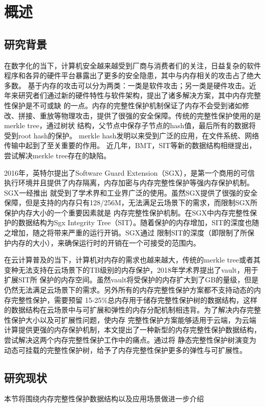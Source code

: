 
\chapter{概述}

\section{研究背景}
在数字化的当下，计算机安全越来越受到厂商与消费者们的关注，日益复杂的软件程序和各异的硬件平台暴露出了更多的安全隐患，其中与内存相关的攻击占了绝大多数。
基于内存的攻击可以分为两类：一类是软件攻击；另一类是硬件攻击。近年来研究者们通过新的硬件特性与软件架构，提出了诸多解决方案，其中内存完整性保护是不可或缺
的一点。内存的完整性保护机制保证了内存不会受到诸如修改、拼接、重放等物理攻击，提供了很强的安全保障。传统的完整性保护使用的是merkle tree，通过树状
结构，父节点中保存子节点的hash值，最后所有的数据将受到root hash的保护。 merkle hash发明以来受到广泛的应用，在文件系统、网络传输中起到了至关重要的作用。
近几年，BMT，SIT等新的数据结构相继提出，尝试解决merkle tree存在的缺陷。

2016年，英特尔提出了Software Guard Extension（SGX），是第一个商用的可信执行环境并且提供了内存隔离，内存加密与内存完整性保护等强内存保护机制。SGX一经推出
就受到了学术界和工业界广泛的使用。虽然SGX提供了很强的安全保障，但是支持的内存只有128/256M，无法满足云场景下的需求，而限制SGX所保护内存大小的一个重要因素就是
内存完整性保护机制。在SGX中内存完整性保护的数据结构为Sgx Integrity Tree（SIT）。随着保护的内存增加，SIT的深度也随之增加，随之将带来严重的运行开销。SGX通过
限制SIT的深度（即限制了所保护内存的大小），来确保运行时的开销在一个可接受的范围内。 

在云计算普及的当下，计算机对内存的需求也越来越大，传统的merkle tree或者其变种无法支持在云场景下的TB级别的内存保护，2018年学术界提出了vault，用于扩展SIT所
保护的内存空间。虽然vault将受保护的内存扩大到了GB的量级，但是仍然无法满足云场景下的需求。另外所有的内存完整性保护方案都不支持动态的内存完整性保护，需要预留
15-25\%总内存用于储存完整性保护树的数据结构，这样的数据结构在云场景中与可扩展和弹性的内存分配机制相违背。为了解决内存完整性保护大小以及可扩展性问题，使内存
完整性保护方案能够适用于云端，为云端计算提供更强的内存保护机制，本文提出了一种新型的内存完整性保护数据结构，尝试解决这两个内存完整性保护工作中的痛点。通过将
静态完整性保护树演变为动态可挂载的完整性保护树，给予了内存完整性保护更多的弹性与可扩展性。

\section{研究现状}
本节将围绕内存完整性保护数据结构以及应用场景做进一步介绍

